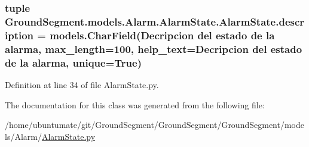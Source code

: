 \subsubsection[{description}]{\setlength{\rightskip}{0pt plus 5cm}tuple Ground\+Segment.\+models.\+Alarm.\+Alarm\+State.\+Alarm\+State.\+description = models.\+Char\+Field(\textquotesingle{}Decripcion del estado de la alarma\textquotesingle{}, max\+\_\+length=100, help\+\_\+text=\textquotesingle{}Decripcion del estado de la alarma\textquotesingle{}, unique=True)\hspace{0.3cm}{\ttfamily [static]}}\label{class_ground_segment_1_1models_1_1_alarm_1_1_alarm_state_1_1_alarm_state_ad84292177e0fc7bdbcfa7e0a5a928ea6}


Definition at line 34 of file Alarm\+State.\+py.



The documentation for this class was generated from the following file\+:\begin{DoxyCompactItemize}
\item 
/home/ubuntumate/git/\+Ground\+Segment/\+Ground\+Segment/\+Ground\+Segment/models/\+Alarm/\hyperlink{_alarm_state_8py}{Alarm\+State.\+py}\end{DoxyCompactItemize}
